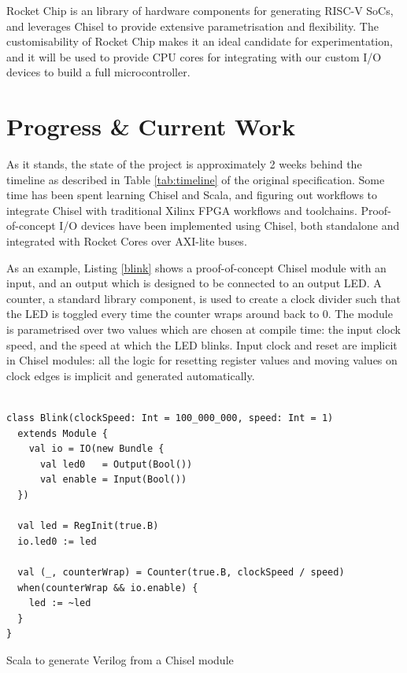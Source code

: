 \documentclass[a4paper,fleqn,12pt]{article}
\begin{document}
Rocket Chip is an library of hardware components for generating RISC-V SoCs, and leverages Chisel to provide extensive parametrisation and flexibility. The customisability of Rocket Chip makes it an ideal candidate for experimentation, and it will be used to provide CPU cores for integrating with our custom I/O devices to build a full microcontroller.

\section{Progress \& Current Work}

As it stands, the state of the project is approximately 2 weeks behind the timeline as described in Table \ref{tab:timeline} of the original specification. Some time has been spent learning Chisel and Scala, and figuring out workflows to integrate Chisel with traditional Xilinx FPGA workflows and toolchains. Proof-of-concept I/O devices have been implemented using Chisel, both standalone and integrated with Rocket Cores over AXI-lite buses.

As an example, Listing \ref{blink} shows a proof-of-concept Chisel module with an  input, and an output  which is designed to be connected to an output LED. A counter, a standard library component, is used to create a clock divider such that the LED is toggled every time the counter wraps around back to 0. The module is parametrised over two values which are chosen at compile time: the input clock speed, and the speed at which the LED blinks. Input clock and reset are implicit in Chisel modules: all the logic for resetting register values and moving values on clock edges is implicit and generated automatically.


\begin{listing}[ht!]
    \vspace{0.5cm}
    \begin{verbatim}

class Blink(clockSpeed: Int = 100_000_000, speed: Int = 1) 
  extends Module {
    val io = IO(new Bundle {
      val led0   = Output(Bool())
      val enable = Input(Bool())
  })
  
  val led = RegInit(true.B)
  io.led0 := led
  
  val (_, counterWrap) = Counter(true.B, clockSpeed / speed)
  when(counterWrap && io.enable) {
    led := ~led
  }
}
    \end{verbatim}
    \caption{Scala to generate Verilog from a Chisel module}
    \label{blink}
\end{listing}
\end{document}
